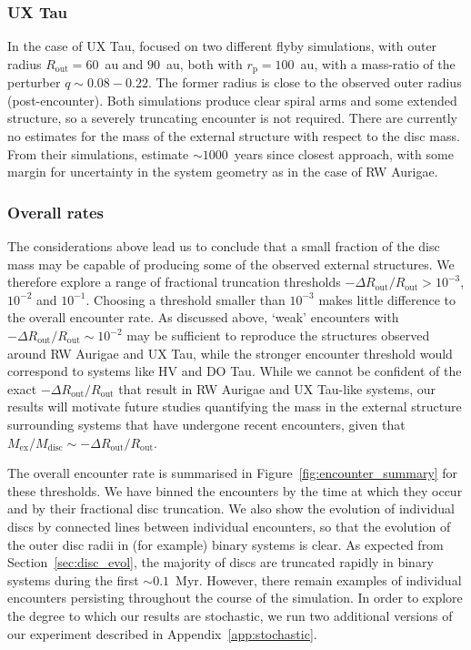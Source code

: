 \documentclass{aa}
\begin{document}
\subsubsection{UX Tau}

In the case of  UX Tau, \citet{Menard20} focused on two different flyby simulations, with outer radius $R_\mathrm{out} = 60$~au and $90$~au, both with $r_\mathrm{p} = 100$~au, with a mass-ratio of the perturber $q \sim 0.08-0.22$.  The former radius is close to the observed outer radius (post-encounter). Both simulations produce clear spiral arms and some extended structure, so a severely truncating encounter is not required. There are currently no estimates for the mass of the external structure with respect to the disc mass. From their simulations, \citet{Menard20} estimate $\sim 1000$~years since closest approach, with some margin for uncertainty in the system geometry as in the case of RW Aurigae. 


\subsubsection{Overall rates}
\label{sec:overall_rates}
The considerations above lead us to conclude that a small fraction of the disc mass may be capable of producing some of the observed external structures. We therefore explore a range of fractional truncation thresholds $-\Delta R_\mathrm{out}/R_\mathrm{out}>10^{-3}$, $10^{-2}$ and $10^{-1}$. Choosing a threshold smaller than $10^{-3}$ makes little difference to the overall encounter rate. As discussed above, `weak' encounters with $-\Delta R_\mathrm{out}/R_\mathrm{out} \sim 10^{-2}$ may be sufficient to reproduce the structures observed around RW Aurigae and UX Tau, while the stronger encounter threshold would correspond to systems like HV and DO Tau. While we cannot be confident of the exact $-\Delta R_\mathrm{out}/R_\mathrm{out}$ that result in RW Aurigae and UX Tau-like systems, our results will motivate future studies quantifying the mass in the external structure surrounding systems that have undergone recent encounters, given that $M_\mathrm{ex}/M_\mathrm{disc} \sim -\Delta R_\mathrm{out}/R_\mathrm{out}$. 

The overall encounter rate is summarised in Figure~\ref{fig:encounter_summary} for these thresholds. We have binned the encounters by the time at which they occur and by their fractional disc truncation. We also show the evolution of individual discs by connected lines between individual encounters, so that the evolution of the outer disc radii in (for example) binary systems is clear. As expected from Section~\ref{sec:disc_evol}, the majority of discs are truncated rapidly in binary systems during the first $\sim 0.1$~Myr. However, there remain examples of individual encounters persisting throughout the course of the simulation. In order to explore the degree to which our results are stochastic, we run two additional versions of our experiment described in Appendix~\ref{app:stochastic}.
\end{document}
